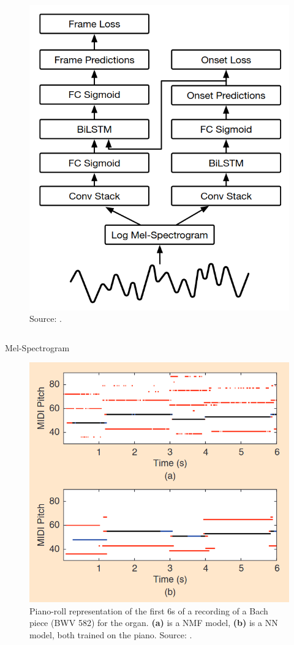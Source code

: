 \documentclass{beamer}
\begin{document}
\begin{frame}[allowframebreaks]
\begin{enumerate}
\begin{columns}
			      \begin{column}{0.6\textwidth}
				      \begin{figure}[!ht]
					      \centering
					      \includegraphics[width=.7\textwidth]{OF.png}
					      \caption{Source: \cite{OF}.}
					      \label{fig:OF}
				      \end{figure}
			      \end{column}
		      \end{columns}



	\end{enumerate}

	\framebreak

	\begin{block}{Mel-Spectrogram}

	\end{block}

	\framebreak

	\begin{figure}[!ht]
		\centering
		\includegraphics[width=.5\textwidth]{comparison.png}
		\caption{Piano-roll representation of the first 6s of a recording of a Bach piece (BWV 582) for the organ. \textbf{(a)} is a NMF model, \textbf{(b)} is a NN model, both trained on the piano. Source: \cite{Overview}.}
		\label{fig:comparison}
	\end{figure}

\end{frame}
\end{document}
